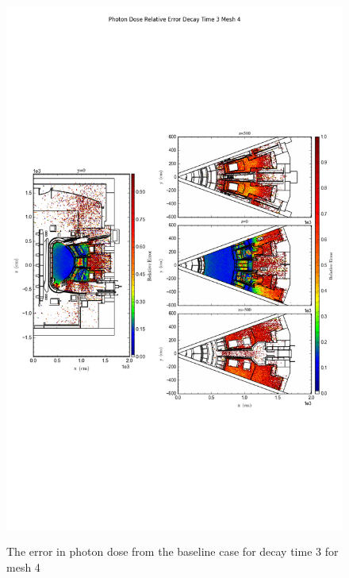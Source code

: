 \begin{figure}[ht!]
\centering
\includegraphics[trim={0cm 9cm 0cm 10cm},clip,scale=0.75]{../plots/final_model/Photon_Dose_Relative_Error_Decay_Time_3_Mesh_4.png}
\label{fig:photons_dc3_no4bc_m4_error}
\caption{The error in photon dose from the baseline case for decay time 3 for mesh 4}
\end{figure}

